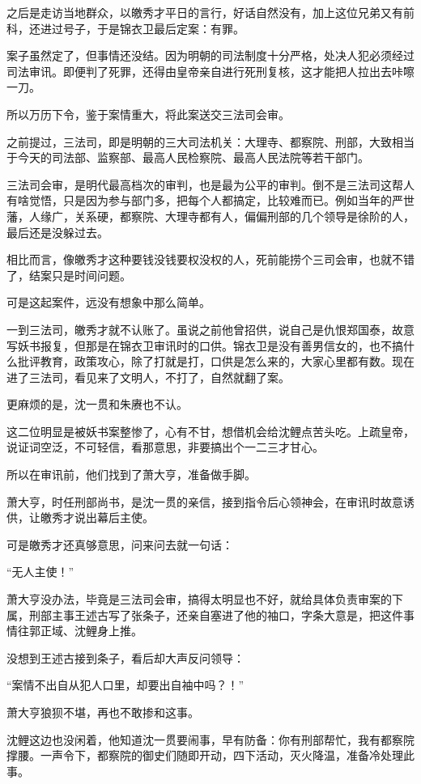 \begin{multicols}{\theparacolNo}
		之后是走访当地群众，以皦秀才平日的言行，好话自然没有，加上这位兄弟又有前科，还进过号子，于是锦衣卫最后定案：有罪。

		案子虽然定了，但事情还没结。因为明朝的司法制度十分严格，处决人犯必须经过司法审讯。即便判了死罪，还得由皇帝亲自进行死刑复核，这才能把人拉出去咔嚓一刀。

		所以万历下令，鉴于案情重大，将此案送交三法司会审。

		之前提过，三法司，即是明朝的三大司法机关：大理寺、都察院、刑部，大致相当于今天的司法部、监察部、最高人民检察院、最高人民法院等若干部门。

		三法司会审，是明代最高档次的审判，也是最为公平的审判。倒不是三法司这帮人有啥觉悟，只是因为参与部门多，把每个人都搞定，比较难而已。例如当年的严世藩，人缘广，关系硬，都察院、大理寺都有人，偏偏刑部的几个领导是徐阶的人，最后还是没躲过去。

		相比而言，像皦秀才这种要钱没钱要权没权的人，死前能捞个三司会审，也就不错了，结案只是时间问题。

		可是这起案件，远没有想象中那么简单。

		一到三法司，皦秀才就不认账了。虽说之前他曾招供，说自己是仇恨郑国泰，故意写妖书报复，但那是在锦衣卫审讯时的口供。锦衣卫是没有善男信女的，也不搞什么批评教育，政策攻心，除了打就是打，口供是怎么来的，大家心里都有数。现在进了三法司，看见来了文明人，不打了，自然就翻了案。

		更麻烦的是，沈一贯和朱赓也不认。

		这二位明显是被妖书案整惨了，心有不甘，想借机会给沈鲤点苦头吃。上疏皇帝，说证词空泛，不可轻信，看那意思，非要搞出个一二三才甘心。

		所以在审讯前，他们找到了萧大亨，准备做手脚。

		萧大亨，时任刑部尚书，是沈一贯的亲信，接到指令后心领神会，在审讯时故意诱供，让皦秀才说出幕后主使。

		可是皦秀才还真够意思，问来问去就一句话：

		“无人主使！”

		萧大亨没办法，毕竟是三法司会审，搞得太明显也不好，就给具体负责审案的下属，刑部主事王述古写了张条子，还亲自塞进了他的袖口，字条大意是，把这件事情往郭正域、沈鲤身上推。

		没想到王述古接到条子，看后却大声反问领导：

		“案情不出自从犯人口里，却要出自袖中吗？！”

		萧大亨狼狈不堪，再也不敢掺和这事。

		沈鲤这边也没闲着，他知道沈一贯要闹事，早有防备：你有刑部帮忙，我有都察院撑腰。一声令下，都察院的御史们随即开动，四下活动，灭火降温，准备冷处理此事。


\end{multicols}

